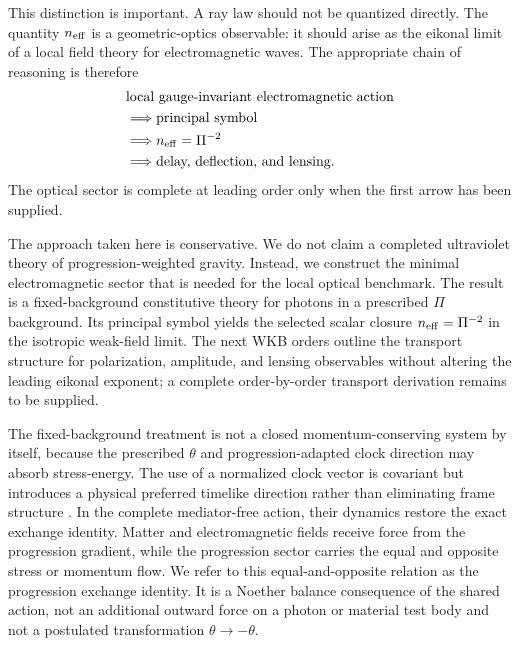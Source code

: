 \documentclass[12pt]{article}
\begin{document}
This distinction is important.  A ray law should not be quantized directly.  The quantity $n_{\rm eff}$ is a geometric-optics observable: it should arise as the eikonal limit of a local field theory for electromagnetic waves.  The appropriate chain of reasoning is therefore
\begin{equation}
\begin{aligned}
&\text{local gauge-invariant electromagnetic action}\\
&\Longrightarrow\text{principal symbol}\\
&\Longrightarrow n_{\rm eff}=\Pi^{-2}\\
&\Longrightarrow\text{delay, deflection, and lensing}.
\end{aligned}
\label{eq:logic_chain}
\end{equation}
The optical sector is complete at leading order only when the first arrow has been supplied.

The approach taken here is conservative.  We do not claim a completed ultraviolet theory of progression-weighted gravity.  Instead, we construct the minimal electromagnetic sector that is needed for the local optical benchmark.  The result is a fixed-background constitutive theory for photons in a prescribed $\Pi$ background.  Its principal symbol yields the selected scalar closure $n_{\rm eff}=\Pi^{-2}$ in the isotropic weak-field limit.  The next WKB orders outline the transport structure for polarization, amplitude, and lensing observables without altering the leading eikonal exponent; a complete order-by-order transport derivation remains to be supplied.

The fixed-background treatment is not a closed momentum-conserving system by itself, because the prescribed \(\theta\) and progression-adapted clock direction may absorb stress-energy.  The use of a normalized clock vector is covariant but introduces a physical preferred timelike direction rather than eliminating frame structure \cite{JacobsonMattingly2001}.  In the complete mediator-free action, their dynamics restore the exact exchange identity.  Matter and electromagnetic fields receive force from the progression gradient, while the progression sector carries the equal and opposite stress or momentum flow.  We refer to this equal-and-opposite relation as the progression exchange identity.  It is a Noether balance consequence of the shared action, not an additional outward force on a photon or material test body and not a postulated transformation \(\theta\to-\theta\).
\end{document}
